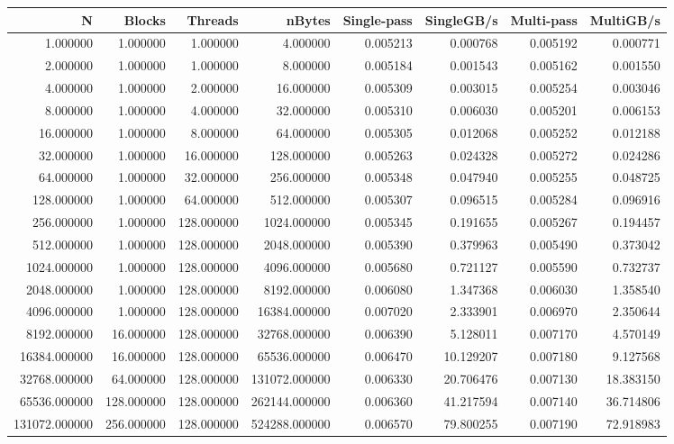 \begin{tabular}{rrrrrrrr}
\toprule
N & Blocks & Threads & nBytes & Single-pass & SingleGB/s & Multi-pass & MultiGB/s \\
\midrule
1.000000 & 1.000000 & 1.000000 & 4.000000 & 0.005213 & 0.000768 & 0.005192 & 0.000771 \\
2.000000 & 1.000000 & 1.000000 & 8.000000 & 0.005184 & 0.001543 & 0.005162 & 0.001550 \\
4.000000 & 1.000000 & 2.000000 & 16.000000 & 0.005309 & 0.003015 & 0.005254 & 0.003046 \\
8.000000 & 1.000000 & 4.000000 & 32.000000 & 0.005310 & 0.006030 & 0.005201 & 0.006153 \\
16.000000 & 1.000000 & 8.000000 & 64.000000 & 0.005305 & 0.012068 & 0.005252 & 0.012188 \\
32.000000 & 1.000000 & 16.000000 & 128.000000 & 0.005263 & 0.024328 & 0.005272 & 0.024286 \\
64.000000 & 1.000000 & 32.000000 & 256.000000 & 0.005348 & 0.047940 & 0.005255 & 0.048725 \\
128.000000 & 1.000000 & 64.000000 & 512.000000 & 0.005307 & 0.096515 & 0.005284 & 0.096916 \\
256.000000 & 1.000000 & 128.000000 & 1024.000000 & 0.005345 & 0.191655 & 0.005267 & 0.194457 \\
512.000000 & 1.000000 & 128.000000 & 2048.000000 & 0.005390 & 0.379963 & 0.005490 & 0.373042 \\
1024.000000 & 1.000000 & 128.000000 & 4096.000000 & 0.005680 & 0.721127 & 0.005590 & 0.732737 \\
2048.000000 & 1.000000 & 128.000000 & 8192.000000 & 0.006080 & 1.347368 & 0.006030 & 1.358540 \\
4096.000000 & 1.000000 & 128.000000 & 16384.000000 & 0.007020 & 2.333901 & 0.006970 & 2.350644 \\
8192.000000 & 16.000000 & 128.000000 & 32768.000000 & 0.006390 & 5.128011 & 0.007170 & 4.570149 \\
16384.000000 & 16.000000 & 128.000000 & 65536.000000 & 0.006470 & 10.129207 & 0.007180 & 9.127568 \\
32768.000000 & 64.000000 & 128.000000 & 131072.000000 & 0.006330 & 20.706476 & 0.007130 & 18.383150 \\
65536.000000 & 128.000000 & 128.000000 & 262144.000000 & 0.006360 & 41.217594 & 0.007140 & 36.714806 \\
131072.000000 & 256.000000 & 128.000000 & 524288.000000 & 0.006570 & 79.800255 & 0.007190 & 72.918983 \\

\end{tabular}
